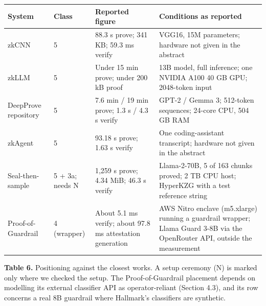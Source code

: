 \documentclass[11pt]{article}
\begin{document}
{\small
\begin{xltabular}{\linewidth}{XXXX}
\toprule
\textbf{System} & \textbf{Class} & \textbf{Reported figure} & \textbf{Conditions as reported} \\ \midrule
\endhead
zkCNN \cite{A5} & 5 & 88.3 s prove; 341 KB; 59.3 ms verify & VGG16, 15M parameters; hardware not given in the abstract \\
zkLLM \cite{A15} & 5 & Under 15 min prove; under 200 kB proof & 13B model, full inference; one NVIDIA A100 40 GB GPU; 2048-token input \\
DeepProve repository \cite{A18} & 5 & 7.6 min / 19 min prove; 1.3 s / 4.3 s verify & GPT-2 / Gemma 3; 512-token sequences; 24-core CPU, 504 GB RAM \\
zkAgent \cite{A19} & 5 & 93.18 s prove; 1.63 s verify & One coding-assistant transcript; hardware not given in the abstract \\
Seal-then-sample \cite{A22} & 5 + 3a; needs N & 1,259 s prove; 4.34 MiB; 46.3 s verify & Llama-2-70B, 5 of 163 chunks proved; 2 TB CPU host; HyperKZG with a test reference string \\
Proof-of-Guardrail \cite{B24} & 4 (wrapper) & About 5.1 ms verify; about 97.8 ms attestation generation & AWS Nitro enclave (m5.xlarge) running a guardrail wrapper; Llama Guard 3-8B via the OpenRouter API, outside the measurement \\
\bottomrule
\end{xltabular}}

\textbf{Table 6.} Positioning against the closest works. A setup ceremony (N) is marked only where we checked the setup. The Proof-of-Guardrail placement depends on modelling its external classifier API as operator-reliant (Section 4.3), and its row concerns a real 8B guardrail where Hallmark's classifiers are synthetic.
\end{document}
